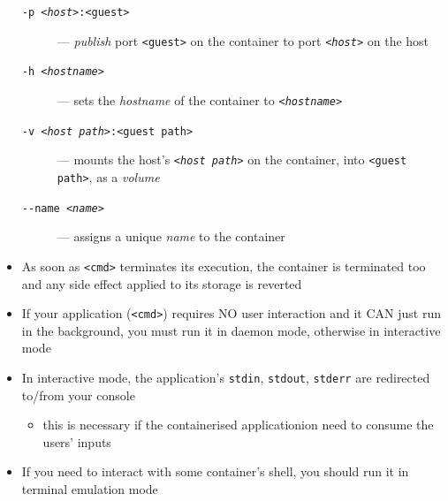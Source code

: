 \documentclass[presentation]{beamer}\mode<presentation>{\usetheme{AMSBolognaFC}}
\begin{document}
\begin{frame}[allowframebreaks]
\begin{itemize}
\begin{description}
        \item[\texttt{-p \textit{<host>}:<guest>}] --- \emph{\alert{p}ublish} port \texttt{<guest>} on the container to port \texttt{\textit{<host>}} on the host

        \item[\texttt{-h \textit{<hostname>}}]  ---  sets the \emph{\alert{h}ostname} of the container to \texttt{\textit{<hostname>}}

        \item[\texttt{-v \textit{<host path>}:<guest path>}]  ---  mounts the host's \texttt{\textit{<host path>}} on the container, into \texttt{<guest path>}, as a \emph{\alert{v}olume}

        \item[\texttt{{-}-name \textit{<name>}}]  ---  assigns a unique \emph{\alert{n}ame} to the container
    \end{description}

    \framebreak

    \item As soon as \texttt{<cmd>} terminates its execution, the container is terminated too and any side effect applied to its storage is reverted

    \medskip

    \item If your application (\texttt{<cmd>}) requires NO user interaction and it CAN just run in the background, you must run it in daemon mode, otherwise in interactive mode

    \medskip

    \item In interactive mode, the application's \texttt{stdin}, \texttt{stdout}, \texttt{stderr} are redirected to/from your console
    \begin{itemize}
        \item this is necessary if the containerised applicationion need to consume the users' inputs
    \end{itemize}

    \medskip

    \item If you need to interact with some container's shell, you should run it in terminal emulation mode
\end{itemize}

\end{frame}
\end{document}
